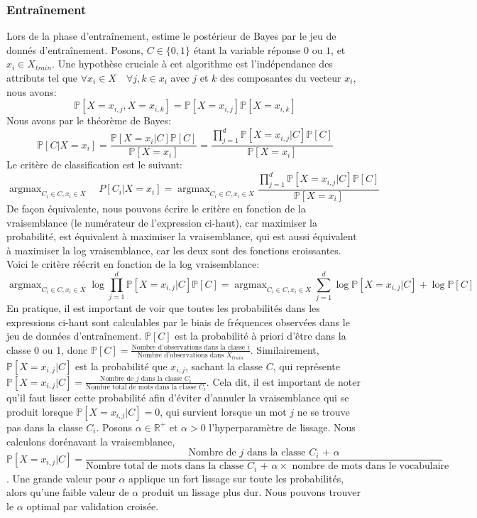 \documentclass{article}
\DeclareMathOperator*{\argmax}{argmax}
\begin{document}
\subsubsection{Entraînement}
Lors de la phase d'entraînement, estime le postérieur de Bayes par le jeu de donnés d'entraînement. Posons, $C \in \{0, 1\}$ étant la variable réponse $0$ ou $1$, et $x_i \in X_{train}$. Une hypothèse cruciale à cet algorithme est l'indépendance des attributs tel que $\forall x_i \in X \quad \forall j, k \in x_i$ avec $j$ et $k$ des composantes du vecteur $x_i$, nous avons:
$$\mathbb{P}[X = x_{i, j}, X = x_{i, k}] = \mathbb{P}[X = x_{i, j}] \mathbb{P}[X = x_{i, k}]$$ Nous avons par le théorème de Bayes:\\
$$\mathbb{P}[C | X=x_i] = \frac{\mathbb{P}[X = x_{i}| C]\mathbb{P}[C]}{\mathbb{P}[X = x_i]} =  \frac{\prod_{j = 1}^{d}\mathbb{P}[X = x_{i,j}| C]\mathbb{P}[C]}{\mathbb{P}[X = x_i]}$$
Le critère de classification est le suivant:
$$\argmax_{C_i \in C, x_i \in X} \quad P[C_i | X = x_i] = \argmax_{C_i \in C, x_i \in X} \frac{\prod_{j = 1}^{d}\mathbb{P}[X = x_{i,j}| C]\mathbb{P}[C]}{\mathbb{P}[X = x_i]}$$
De façon équivalente, nous pouvons écrire le critère en fonction de la vraisemblance (le numérateur de l'expression ci-haut), car maximiser la probabilité, est équivalent à maximiser la vraisemblance, qui est aussi équivalent à maximiser la log vraisemblance, car les deux sont des fonctions croissantes. Voici le critère réécrit en fonction de la log vraisemblance:
$$\argmax_{C_i \in C, x_i \in X} \log{\prod_{j = 1}^{d}\mathbb{P}[X = x_{i,j}| C]\mathbb{P}[C]} = \argmax_{C_i \in C, x_i \in X} \sum_{j = 1}^{d} \log{\mathbb{P}[X = x_{i,j}| C]} + \log{\mathbb{P}[C]}$$
En pratique, il est important de voir que toutes les probabilités dans les expressions ci-haut sont calculables par le biais de fréquences observées dans le jeu de données d'entraînement. $\mathbb{P}[C]$ est la probabilité à priori d'être dans la classe 0 ou 1, donc $\mathbb{P}[C] = \frac{\text{Nombre d'observations dans la classe $i$}}{\text{Nombre d'observations dans $X_{train}$}}$. Similairement, $\mathbb{P}[X = x_{i, j}| C]$ est la probabilité que $x_{i, j}$, sachant la classe $C$, qui représente $\mathbb{P}[X = x_{i, j}| C] = \frac{\text{Nombre de $j$ dans la classe $C_i$}}{\text{Nombre total de mots dans la classe $C_i$}}$. Cela dit, il est important de noter qu'il faut lisser cette probabilité afin d'éviter d'annuler la vraisemblance qui se produit lorsque $\mathbb{P}[X = x_{i, j}| C] = 0$, qui survient lorsque un mot $j$ ne se trouve pas dans la classe $C_i$. Posons $\alpha \in \mathbb{R}^{+}$ et $\alpha > 0$ l'hyperparamètre de lissage. Nous calculons dorénavant la vraisemblance, $$\mathbb{P}[X = x_{i, j}| C] = \frac{\text{Nombre de $j$ dans la classe $C_i$ + $\alpha$}}{\text{Nombre total de mots dans la classe $C_i$ + $\alpha \times$ nombre de mots dans le vocabulaire}}$$. Une grande valeur pour $\alpha$ applique un fort lissage sur toute les probabilités, alors qu'une faible valeur de $\alpha$ produit un lissage plus dur. Nous pouvons trouver le $\alpha$ optimal par validation croisée. 
\end{document}
